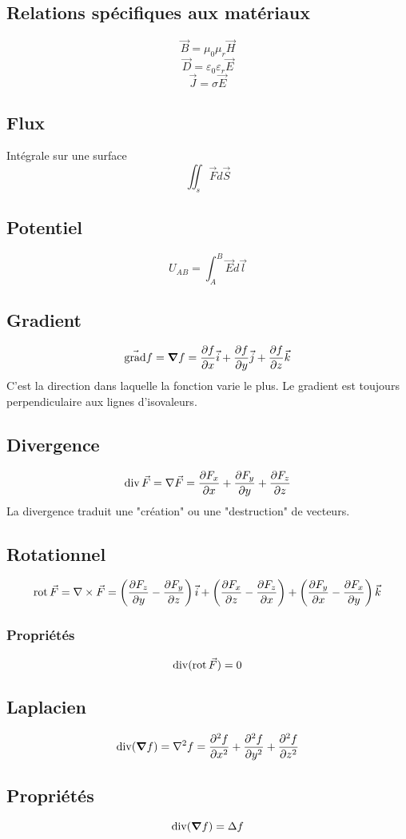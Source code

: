 \documentclass[resume]{subfiles}
\begin{document}
\subsection{Relations spécifiques aux matériaux}
$$\vec{B}=\mu_0\mu_r\vec{H}$$
$$\vec{D}=\varepsilon_0\varepsilon_r\vec{E}$$
$$\vec{J}=\sigma\vec{E}$$
\subsection{Flux}
Intégrale sur une surface
$$\iint_s\vec{F}d\vec{S}$$
\subsection{Potentiel}
$$U_{AB}=\int_{A}^{B}\vec{E}d\vec{l}$$
\subsection{Gradient}
$$\vec{\text{grad}}f=\grad f=\frac{\partial f}{\partial x}\vec{i}+\frac{\partial f}{\partial y}\vec{j}+\frac{\partial f}{\partial z}\vec{k}$$
C'est la direction dans laquelle la fonction varie le plus. Le gradient est toujours perpendiculaire aux lignes d'isovaleurs.
\subsection{Divergence}
$$\operatorname{div}\vec{F}=\nabla \vec{F}=\frac{\partial F_x}{\partial x}+\frac{\partial F_y}{\partial y}+\frac{\partial F_z}{\partial z}$$
La divergence traduit une "création" ou une "destruction" de vecteurs.
\subsection{Rotationnel}
$$\operatorname{rot} \vec{F}=\nabla \times \vec{F}=\left(\frac{\partial F_z}{\partial y}-\frac{\partial F_y}{\partial z}\right)\vec{i}+\left(\frac{\partial F_x}{\partial z}- \frac{\partial F_z}{\partial x}\right)+\left(\frac{\partial F_y}{\partial x}-\frac{\partial F_x}{\partial y}\right)\vec{k}$$
\subsubsection{Propriétés}
$$\operatorname{div}(\operatorname{rot} \vec{F})=0$$
\subsection{Laplacien}
$$\operatorname{div}(\grad f)=\nabla^2 f=\frac{\partial^2 f}{\partial x^2}+\frac{\partial^2 f}{\partial y^2}+\frac{\partial^2 f}{\partial z^2}$$
\subsection{Propriétés}
$$\operatorname{div}(\grad f)=\Delta f$$
\end{document}
